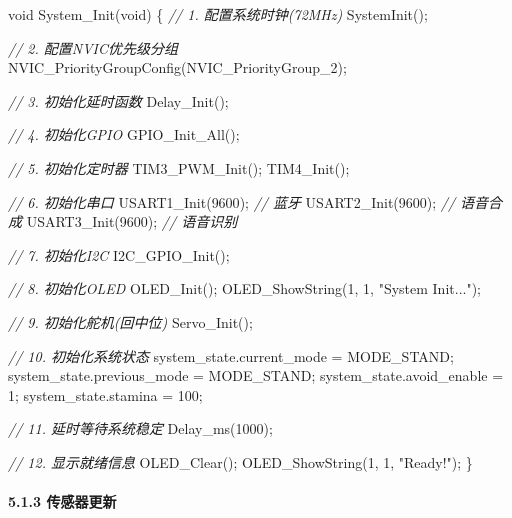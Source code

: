 \documentclass[
]{article}
\newenvironment{Shaded}{}{}
\newcommand{\CommentTok}[1]{\textcolor[rgb]{0.38,0.63,0.69}{\textit{#1}}}
\newcommand{\DataTypeTok}[1]{\textcolor[rgb]{0.56,0.13,0.00}{#1}}
\newcommand{\DecValTok}[1]{\textcolor[rgb]{0.25,0.63,0.44}{#1}}
\newcommand{\NormalTok}[1]{#1}
\newcommand{\StringTok}[1]{\textcolor[rgb]{0.25,0.44,0.63}{#1}}
\begin{document}
\begin{Shaded}
\begin{Highlighting}[]
\DataTypeTok{void}\NormalTok{ System\_Init(}\DataTypeTok{void}\NormalTok{)}
\NormalTok{\{}
    \CommentTok{// 1. 配置系统时钟(72MHz)}
\NormalTok{    SystemInit();}
    
    \CommentTok{// 2. 配置NVIC优先级分组}
\NormalTok{    NVIC\_PriorityGroupConfig(NVIC\_PriorityGroup\_2);}
    
    \CommentTok{// 3. 初始化延时函数}
\NormalTok{    Delay\_Init();}
    
    \CommentTok{// 4. 初始化GPIO}
\NormalTok{    GPIO\_Init\_All();}
    
    \CommentTok{// 5. 初始化定时器}
\NormalTok{    TIM3\_PWM\_Init();}
\NormalTok{    TIM4\_Init();}
    
    \CommentTok{// 6. 初始化串口}
\NormalTok{    USART1\_Init(}\DecValTok{9600}\NormalTok{);   }\CommentTok{// 蓝牙}
\NormalTok{    USART2\_Init(}\DecValTok{9600}\NormalTok{);   }\CommentTok{// 语音合成}
\NormalTok{    USART3\_Init(}\DecValTok{9600}\NormalTok{);   }\CommentTok{// 语音识别}
    
    \CommentTok{// 7. 初始化I2C}
\NormalTok{    I2C\_GPIO\_Init();}
    
    \CommentTok{// 8. 初始化OLED}
\NormalTok{    OLED\_Init();}
\NormalTok{    OLED\_ShowString(}\DecValTok{1}\NormalTok{, }\DecValTok{1}\NormalTok{, }\StringTok{"System Init..."}\NormalTok{);}
    
    \CommentTok{// 9. 初始化舵机(回中位)}
\NormalTok{    Servo\_Init();}
    
    \CommentTok{// 10. 初始化系统状态}
\NormalTok{    system\_state.current\_mode = MODE\_STAND;}
\NormalTok{    system\_state.previous\_mode = MODE\_STAND;}
\NormalTok{    system\_state.avoid\_enable = }\DecValTok{1}\NormalTok{;}
\NormalTok{    system\_state.stamina = }\DecValTok{100}\NormalTok{;}
    
    \CommentTok{// 11. 延时等待系统稳定}
\NormalTok{    Delay\_ms(}\DecValTok{1000}\NormalTok{);}
    
    \CommentTok{// 12. 显示就绪信息}
\NormalTok{    OLED\_Clear();}
\NormalTok{    OLED\_ShowString(}\DecValTok{1}\NormalTok{, }\DecValTok{1}\NormalTok{, }\StringTok{"Ready!"}\NormalTok{);}
\NormalTok{\}}
\end{Highlighting}
\end{Shaded}

\hypertarget{ux4f20ux611fux5668ux66f4ux65b0}{%
\paragraph{5.1.3 传感器更新}\label{ux4f20ux611fux5668ux66f4ux65b0}}
\end{document}
